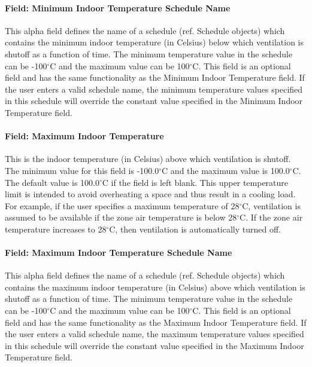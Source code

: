 \paragraph{Field: Minimum Indoor Temperature Schedule Name}\label{field-minimum-indoor-temperature-schedule-name-1}

This alpha field defines the name of a schedule (ref. Schedule objects) which contains the minimum indoor temperature (in Celsius) below which ventilation is shutoff as a function of time. The minimum temperature value in the schedule can be -100$^\circ$C and the maximum value can be 100$^\circ$C. This field is an optional field and has the same functionality as the Minimum Indoor Temperature field. If the user enters a valid schedule name, the minimum temperature values specified in this schedule will override the constant value specified in the Minimum Indoor Temperature field.

\paragraph{Field: Maximum Indoor Temperature}\label{field-maximum-indoor-temperature-1}

This is the indoor temperature (in Celsius) above which ventilation is shutoff. The minimum value for this field is -100.0$^\circ$C and the maximum value is 100.0$^\circ$C. The default value is 100.0$^\circ$C if the field is left blank. This upper temperature limit is intended to avoid overheating a space and thus result in a cooling load. For example, if the user specifies a maximum temperature of 28$^\circ$C, ventilation is assumed to be available if the zone air temperature is below 28$^\circ$C. If the zone air temperature increases to 28$^\circ$C, then ventilation is automatically turned off.

\paragraph{Field: Maximum Indoor Temperature Schedule Name}\label{field-maximum-indoor-temperature-schedule-name-1}

This alpha field defines the name of a schedule (ref. Schedule objects) which contains the maximum indoor temperature (in Celsius) above which ventilation is shutoff as a function of time. The minimum temperature value in the schedule can be -100$^\circ$C and the maximum value can be 100$^\circ$C. This field is an optional field and has the same functionality as the Maximum Indoor Temperature field. If the user enters a valid schedule name, the maximum temperature values specified in this schedule will override the constant value specified in the Maximum Indoor Temperature field.

